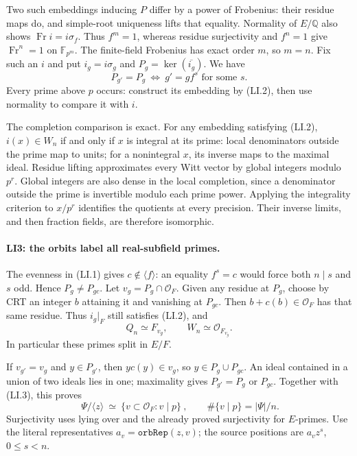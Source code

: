 Two such embeddings inducing $P$ differ by a power of Frobenius:
their residue maps do, and simple-root uniqueness lifts that equality.
Normality of $E/\mathbb Q$ also shows
$\operatorname{Fr}i=i\sigma_f$. Thus $f^m=1$, whereas residue
surjectivity and $f^n=1$ give $\operatorname{Fr}^n=1$ on
$\mathbb F_{p^m}$. The finite-field Frobenius has exact order $m$,
so $m=n$. Fix such an $i$ and put $i_g=i\sigma_g$ and
$P_g=\ker(\overline{i_g})$. We have
\[
 P_{g'}=P_g\ \Longleftrightarrow\ g'=gf^s\text{ for some }s.
                                                               \tag{LI.3}
\]
Every prime above $p$ occurs: construct its embedding by (LI.2),
then use normality to compare it with $i$.

The completion comparison is exact. For any embedding satisfying
(LI.2), $i(x)\in W_n$ if and only if $x$ is integral at its prime:
local denominators outside the prime map to units; for a nonintegral
$x$, its inverse maps to the maximal ideal. Residue lifting approximates
every Witt vector by global integers modulo $p^r$. Global integers are
also dense in the local completion, since a denominator outside the
prime is invertible modulo each prime power. Applying the integrality
criterion to $x/p^r$ identifies the quotients at every precision.
Their inverse limits, and then fraction fields, are therefore isomorphic.

\paragraph{LI3: the orbits label all real-subfield primes.}
The evenness in (LI.1) gives $c\notin\langle f\rangle$: an equality
$f^s=c$ would force both $n\mid s$ and $s$ odd. Hence
$P_g\ne P_{gc}$. Let $v_g=P_g\cap\mathcal O_F$.
Given any residue at $P_g$, choose by CRT an integer $b$ attaining it
and vanishing at $P_{gc}$. Then $b+c(b)\in\mathcal O_F$ has that
same residue. Thus $i_g|_F$ still satisfies (LI.2), and
\[
 Q_n\simeq F_{v_g},\qquad W_n\simeq\mathcal O_{F_{v_g}}. \tag{LI.4}
\]
In particular these primes split in $E/F$.

If $v_{g'}=v_g$ and $y\in P_{g'}$, then $yc(y)\in v_g$,
so $y\in P_g\cup P_{gc}$. An ideal contained in a union of two
ideals lies in one; maximality gives $P_{g'}=P_g$ or $P_{gc}$.
Together with (LI.3), this proves
\[
 \boxed{\ \Psi/\langle z\rangle\ \simeq\
          \{v\subset\mathcal O_F:v\mid p\}\ },
 \qquad\#\{v\mid p\}=|\Psi|/n.                         \tag{LI.5}
\]
Surjectivity uses lying over and the already proved surjectivity for
$E$-primes. Use the literal representatives $a_v=\texttt{orbRep}(z,v)$;
the source positions are $a_vz^s$, $0\le s<n$.


